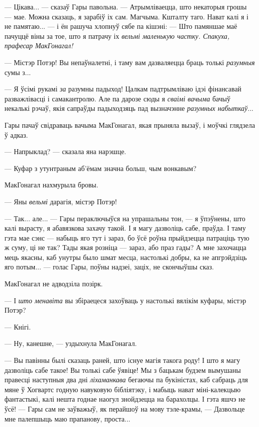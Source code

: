 --- Цікава... --- сказаў Гары павольна. --- Атрымліваецца, што некаторыя грошы --- мае.
Можна сказаць, я зарабіў іх сам. Магчыма. Кшталту таго. Нават калі я і не памятаю... --- і ён 
рашуча хлопнуў сябе па кішэні: --- Што памяншае маё пачуццё віны за тое, што я патрачу іх
\emph{вельмі маленькую частку. Спакуха, прафесар МакГонагал!}

--- Містэр Потэр! Вы непаўналетні, і таму вам дазваляецца браць толькі \emph{разумныя} сумы з...

--- Я ўсімі рукамі \emph{за} разумны падыход! Цалкам падтрымліваю ідэі фінансавай разважлівасці
і самакантролю. Але па дарозе сюды я \emph{сваімі вачыма} бачыў некалькі рэчаў, якія сапраўды
падыходзяць пад вызначэнне \emph{разумных набыткаў}...

Гары пачаў свідраваць вачыма МакГонагал, якая прыняла вызаў, і моўчкі глядзела ў адказ.

--- Напрыклад? --- сказала яна нарэшце.

--- Куфар з утунтраным аб'ёмам значна больш, чым вонкавым?

МакГонагал нахмурыла бровы. 

--- Яны \emph{вельмі} дарагія, містэр Потэр!

--- Так... але... --- Гары пераключыўся на упрашальны тон, --- я ўпэўнены, што калі вырасту, 
я абавязкова захачу такой. І я магу дазволіць сабе, праўда. І таму гэта мае сэнс  --- набыць
яго тут і зараз, бо ўсё роўна прыйдзецца патраціць тую ж суму, ці не так? Тады якая розніца ---
зараз, або праз гады? А мне захочацца мець якасны, каб унутры было шмат месца, настолькі 
добры, ка не апгрэйдзіць яго потым... --- голас Гары, поўны надзеі, заціх, не скончыўшы сказ.

МакГонагал не адводзіла позірк.

--- І \emph{што менавіта} вы збіраецеся захоўваць у настолькі вялікім куфары, містэр Потэр?

--- Кнігі.

--- Ну, канешне, --- уздыхнула МакГонагал.

--- Вы павінны былі сказаць раней, што існуе магія такога роду! І што я магу дазволіць сабе такое!
Вы толькі сабе ўявіце! Мы з бацькам будзем вымушаны правесці наступныя два дні \emph{ліхаманкава}
бегаючы па букіністах, каб сабраць для мяне ў Хогвартс годную навуковую бібліятэку, і мабыць
нават міні-калекцыю фантастыкі, калі нешта годнае наогул знойдзецца на барахолцы.
І гэта яшчэ не ўсё! --- Гары сам не заўважыў, як перайшоў на мову тэле-крамы, --- Дазвольце мне
палепшыць маю прапанову, проста...

